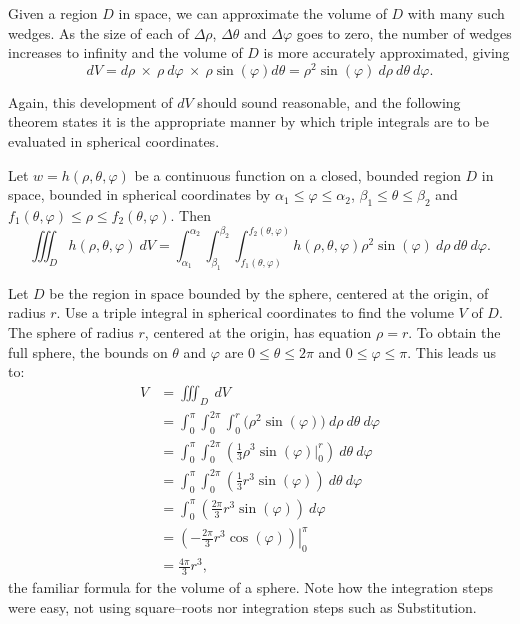 Given a region $D$ in space, we can approximate the volume of $D$ with many such wedges. As the size of each of $\Delta\rho$, $\Delta\theta$ and $\Delta\varphi$ goes to zero, the number of wedges increases to infinity and the volume of $D$ is more accurately approximated, giving
$$dV = d\rho\ \times\ \rho\ d\varphi\ \times\ \rho\sin(\varphi)d\theta = \rho^2\sin(\varphi)\ d\rho\ d\theta\ d\varphi.$$

Again, this development of $dV$ should sound reasonable, and the following theorem states it is the appropriate manner by which triple integrals are to be evaluated in spherical coordinates.

{Let $w=h(\rho,\theta,\varphi)$ be a continuous function on a closed, bounded region $D$ in space, bounded in spherical coordinates by $\alpha_1 \leq \varphi \leq \alpha_2$, $\beta_1 \leq \theta \leq \beta_2$ and $f_1(\theta,\varphi) \leq \rho \leq f_2(\theta,\varphi)$. Then 
$$\iiint_D h(\rho,\theta,\varphi)\ dV = \int_{\alpha_1}^{\alpha_2}\int_{\beta_1}^{\beta_2}\int_{f_1(\theta,\varphi)}^{f_2(\theta,\varphi)} h(\rho,\theta,\varphi) \rho^2\sin(\varphi)\ d\rho\ d\theta\ d\varphi.$$
}

{Let $D$ be the region in space bounded by the sphere, centered at the origin, of radius $r$. Use a triple integral in spherical coordinates to find the volume $V$ of $D$.
}
{The sphere of radius $r$, centered at the origin, has equation $\rho = r$. To obtain the full sphere, the bounds on $\theta$ and $\varphi$ are $0\leq \theta \leq 2\pi$ and $0 \leq \varphi \leq \pi$. This leads us to:
\begin{align*}
V &= \iiint_D\ dV\\
	&= \int_0^{\pi}\int_0^{2\pi}\int_0^r\big(\rho^2\sin(\varphi)\big)\ d\rho\ d\theta\ d\varphi\\
	&= \int_0^\pi\int_0^{2\pi}\left(\frac13\rho^3\sin(\varphi)\Big|_0^r\right)\ d\theta\ d\varphi\\
	&= \int_0^\pi\int_0^{2\pi} \left(\frac13r^3\sin(\varphi)\right)\ d\theta\ d\varphi\\
	&= \int_0^\pi \left(\frac{2\pi}3r^3\sin(\varphi)\right)\ d\varphi\\
	&= \left.\left(-\frac{2\pi}3r^3\cos(\varphi)\right)\right|_0^{\pi}\\
	&= \frac{4\pi}3r^3,
\end{align*}
the familiar formula for the volume of a sphere. Note how the integration steps were easy, not using square--roots nor integration steps such as Substitution.
}\\

